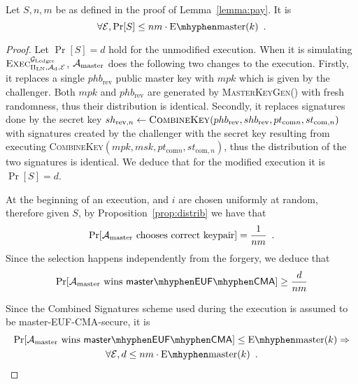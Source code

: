   \begin{proposition}
  \label{prop:forgery:master}
    Let $S, n, m$ be as defined in the proof of Lemma~\ref{lemma:pay}. It is
    \begin{equation*}
      \forall \environment, \Pr[S] \leq nm \cdot \mathrm{E \mhyphen master}(k)
      \enspace.
    \end{equation*}
  \end{proposition}

  \begin{proof}
    Let $\Pr[S] = d$ hold for the unmodified execution. When it is simulating
    $\textsc{Exec}^{\mathcal{G}_{\mathrm{Ledger}}}_{\Pi_{\mathrm{LN}}, \mathcal{A}_{\mathrm{d}},
    \mathcal{E}}$, $\mathcal{A}_{\mathrm{master}}$ does the following two changes
    to the execution. Firstly, it replaces a single $phb_{\mathrm{rev}}$ public
    master key with $mpk$ which is given by the challenger. Both $mpk$ and
    $phb_{\mathrm{rev}}$ are generated by \textsc{MasterKeyGen}() with fresh
    randomness, thus their distribution is identical. Secondly, it replaces
    signatures done by the secret key $sh_{\mathrm{rev}, n} \gets
    \textsc{CombineKey}(phb_{\mathrm{rev}}, shb_{\mathrm{rev}}, pt_{\mathrm{com}
    n}, st_{\mathrm{com}, n})$ with signatures created by the challenger with
    the secret key resulting from executing \textsc{CombineKey}$(mpk, msk,
    pt_{\mathrm{com} n}, st_{\mathrm{com}, n})$, thus the distribution of the
    two signatures is identical. We deduce that for the modified execution it is
    $\Pr[S] = d$.

    At the beginning of an execution, \alice and $i$ are chosen uniformly
    at random, therefore given $S$, by Proposition~\ref{prop:distrib} we have
    that
    \begin{equation*}
      \Pr[\mathcal{A}_{\mathrm{master}} \text{ chooses correct keypair}] =
      \frac{1}{nm} \enspace.
    \end{equation*}
    Since the selection happens independently from the forgery, we deduce that
    \begin{equation*}
      \Pr[\adversary_{\mathrm{master}} \text{ wins } \mathsf{master \mhyphen EUF
      \mhyphen CMA}] \geq \frac{d}{nm}
    \end{equation*}

    Since the Combined Signatures scheme used during the execution is
    assumed to be \textsf{master-EUF-CMA}-secure, it is
    \begin{gather*}
      \Pr[\adversary_{\mathrm{master}} \text{ wins } \mathsf{master \mhyphen EUF
      \mhyphen CMA}] \leq \mathrm{E \mhyphen master}(k) \Rightarrow \\
      \forall \environment, d \leq nm \cdot \mathrm{E \mhyphen master}(k)
      \enspace.
    \end{gather*}
  \end{proof}
